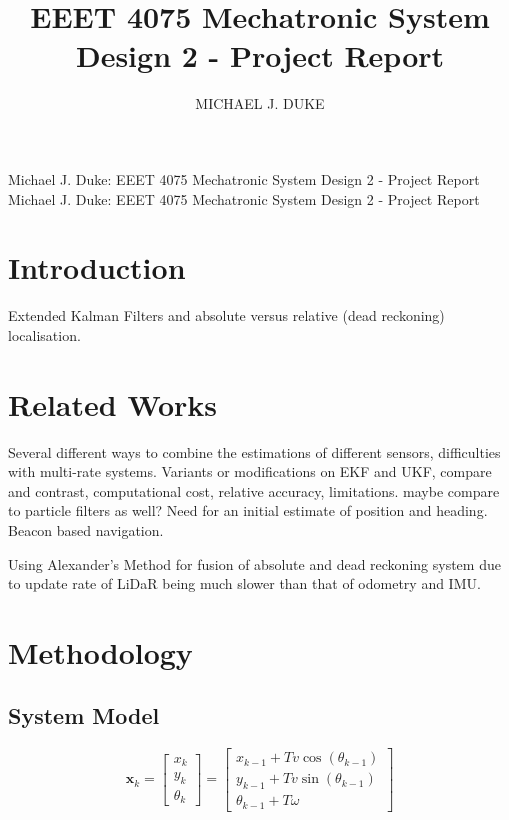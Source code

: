 \documentclass{ieeeaccess}
\begin{document}

\title{EEET 4075 Mechatronic System Design 2 - Project Report}
\author{\uppercase{Michael J. Duke}}
\address[1]{University of South Australia, Mawson Lakes, SA 5095 Australia (e-mail: dukmj002@mymail.unisa.edu.au)}

\markboth
{Michael J. Duke: EEET 4075 Mechatronic System Design 2 - Project Report}
{Michael J. Duke: EEET 4075 Mechatronic System Design 2 - Project Report}

\titlepgskip=-15pt

\maketitle

\section{Introduction}
\label{sec:introduction}
 Extended Kalman Filters and absolute versus relative (dead reckoning) localisation.

\section{Related Works}
\label{sec:rel}
	Several different ways to combine the estimations of different sensors, difficulties with multi-rate systems. Variants or modifications on EKF and UKF, compare and contrast, computational cost, relative accuracy, limitations. maybe compare to particle filters as well? Need for an initial estimate of position and heading. Beacon based navigation.\par
	Using Alexander's Method for fusion of absolute and dead reckoning system due to update rate of LiDaR being much slower than that of odometry and IMU.

\section{Methodology}
\label{sec:meth}
\subsection{System Model}
	\begin{equation}
	\label{eq:xsys}
		\boldsymbol{x}_{ k} = 
		\begin{bmatrix}
			x _{ k}	\\
			y_{ k}		\\
			\theta_{ k}
		\end{bmatrix}
		=
		\begin{bmatrix}
			x_{k-1}+Tv\cos{\left(\theta_{k-1}\right)}								\\
			y_{k-1}+Tv\sin{\left(\theta_{k-1}\right)}								\\
			\theta_{k-1} + T\omega
		\end{bmatrix}
	\end{equation}
	
\end{document}
